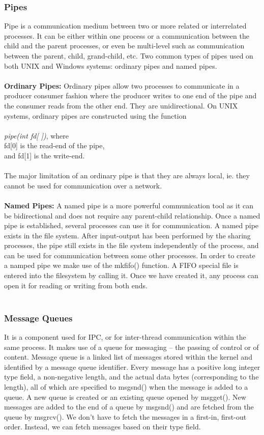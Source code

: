 \subsubsection*{\large Pipes}
Pipe is a communication medium between two or more related or interrelated processes. It can be either within one process or a communication between the child and the parent processes, or even be multi-level such as communication between the
parent, child, grand-child, etc. Two common types of pipes used on both UNIX and Windows systems: ordinary pipes and named pipes.\\
\\
\textbf{Ordinary Pipes: }Ordinary pipes allow two processes to communicate in a producer consumer fashion where the producer writes to one end of the pipe and the consumer reads from the other end. They are unidirectional. On UNIX systems, ordinary pipes are constructed using the function \\
\\
\textit{pipe(int fd[ ])}, where \\
fd[0] is the read-end of the pipe, \\
and fd[1] is the write-end. 
\\
\\
The major limitation of an ordinary pipe is that they are always local, ie. they cannot be used for communication over a network.
\\
\\
\textbf{Named Pipes: }A named pipe is a more powerful communication tool as it can be bidirectional and does not require any parent-child relationship. Once a named pipe is established, several processes can use it for communication. A named pipe exists in the file system. After input-output has been performed by the sharing processes, the pipe still exists in the file system independently of the process, and can be used for communication between some other processes. In order to create a namped pipe we make use of the mkfifo() function. A FIFO special file is entered into the filesystem by calling it. Once we have created it, any process can open it for reading or writing from both ends.
\\
\\
\subsubsection*{\large Message Queues}
It is a component used for IPC, or for inter-thread communication within the same process. It makes use of a queue for messaging – the passing of control or of content. Message queue is a linked list of messages stored within the kernel and identified by a message queue identifier. Every message has a positive long integer type field, a non-negative length, and the actual data bytes (corresponding to the length), all of which are specified to msgsnd() when the message is added to a queue. A new queue is created or an existing queue opened by msgget(). New messages are added to the end of a queue by msgsnd() and are fetched from the queue by msgrcv(). We don’t have to fetch the messages in a first-in, first-out order. Instead, we can fetch messages based on their type field.
